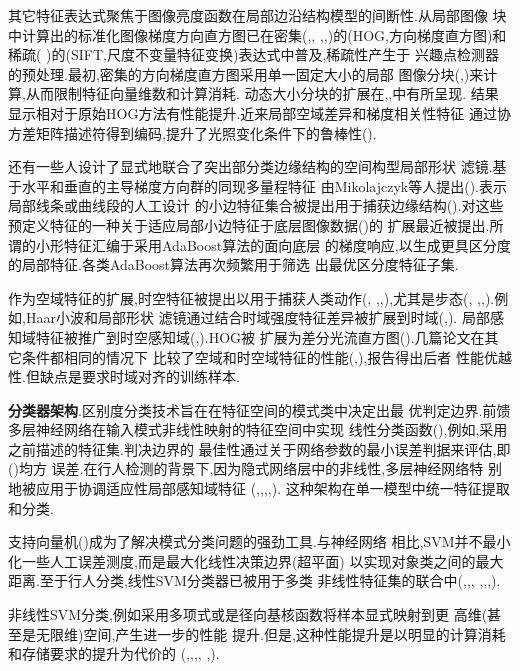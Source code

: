 \documentclass[10pt,letterpaper,journal,compsoc]{IEEEtran}
\begin{document}
其它特征表达式聚焦于图像亮度函数在局部边沿结构模型的间断性.从局部图像
块中计算出的标准化图像梯度方向直方图已在密集(\cite{bib11},\cite{bib62},
\cite{bib63},\cite{bib80},\cite{bib83})的(HOG,方向梯度直方图)和稀疏(
\cite{bib42})的(SIFT,尺度不变量特征变换)表达式中普及,稀疏性产生于
兴趣点检测器的预处理.最初,密集的方向梯度直方图采用单一固定大小的局部
图像分块(\cite{bib11},\cite{bib62})来计算,从而限制特征向量维数和计算消耗.
动态大小分块的扩展在\cite{bib63},\cite{bib80},\cite{bib83}中有所呈现.
结果显示相对于原始HOG方法有性能提升.近来局部空域差异和梯度相关性特征
通过协方差矩阵描述符得到编码,提升了光照变化条件下的鲁棒性(\cite{bib71}).

还有一些人设计了显式地联合了突出部分类边缘结构的空间构型局部形状
滤镜.基于水平和垂直的主导梯度方向群的同现多量程特征
由Mikolajczyk等人提出(\cite{bib45}).表示局部线条或曲线段的人工设计
的小边特征集合被提出用于捕获边缘结构(\cite{bib76}).对这些
预定义特征的一种关于适应局部小边特征于底层图像数据(\cite{bib60})的
扩展最近被提出.所谓的小形特征汇编于采用AdaBoost算法的面向底层
的梯度响应,以生成更具区分度的局部特征.各类AdaBoost算法再次频繁用于筛选
出最优区分度特征子集.

作为空域特征的扩展,时空特征被提出以用于捕获人类动作(\cite{bib12},
\cite{bib15},\cite{bib65},\cite{bib74}),尤其是步态(\cite{bib27},
\cite{bib38},\cite{bib56},\cite{bib75}).例如,Haar小波和局部形状
滤镜通过结合时域强度特征差异被扩展到时域(\cite{bib65},\cite{bib74}).
局部感知域特征被推广到时空感知域(\cite{bib27},\cite{bib75}).HOG被
扩展为差分光流直方图(\cite{bib12}).几篇论文在其它条件都相同的情况下
比较了空域和时空域特征的性能(\cite{bib12},\cite{bib74}),报告得出后者
性能优越性.但缺点是要求时域对齐的训练样本.

\textbf{分类器架构}.区别度分类技术旨在在特征空间的模式类中决定出最
优判定边界.前馈多层神经网络在输入模式非线性映射的特征空间中实现
线性分类函数(\cite{bib33}),例如,采用之前描述的特征集.判决边界的
最佳性通过关于网络参数的最小误差判据来评估,即(\cite{bib33})均方
误差.在行人检测的背景下,因为隐式网络层中的非线性,多层神经网络特
别地被应用于协调适应性局部感知域特征
(\cite{bib19},\cite{bib23},\cite{bib49},\cite{bib68},\cite{bib75}).
这种架构在单一模型中统一特征提取和分类.

支持向量机(\cite{bib73})成为了解决模式分类问题的强劲工具.与神经网络
相比,SVM并不最小化一些人工误差测度,而是最大化线性决策边界(超平面)
以实现对象类之间的最大距离.至于行人分类,线性SVM分类器已被用于多类
非线性特征集的联合中(\cite{bib11},\cite{bib12},\cite{bib51},
\cite{bib63},\cite{bib64},\cite{bib80},\cite{bib83}).

非线性SVM分类,例如采用多项式或是径向基核函数将样本显式映射到更
高维(甚至是无限维)空间,产生进一步的性能
提升.但是,这种性能提升是以明显的计算消耗和存储要求的提升为代价的
(\cite{bib2},\cite{bib48},\cite{bib49},\cite{bib51},\cite{bib53}
,\cite{bib68}).
\end{document}
